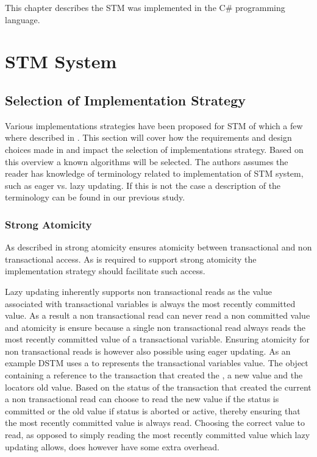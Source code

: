 \makeatletter {}\makeatother
{}
This chapter describes the \ac{STM} was implemented in the C\# programming language.
\label{chap:implementation}
\section{\acs{STM} System}
\subsection{Selection of Implementation Strategy}
Various implementations strategies have been proposed for \ac{STM} of which a few where described in . This section will cover how the requirements and design choices made in  and  impact the selection of implementations strategy. Based on this overview a known algorithms will be selected. The authors assumes the reader has knowledge of terminology related to implementation of \ac{STM} system, such as eager vs. lazy updating. If this is not the case a description of the terminology can be found in our previous study\cite[p. 53]{dpt907e14trending}.

\subsubsection{Strong Atomicity}
As described in  strong atomicity ensures atomicity between transactional and non transactional access. As \stmnamesp is required to support strong atomicity the implementation strategy should facilitate such access.

Lazy updating inherently supports non transactional reads as the value associated with transactional variables is always the most recently committed value\cite[p. 2084]{herlihy2011tm}\cite[p. 21]{harris2010transactional}. As a result a non transactional read can never read a non committed value and atomicity is ensure because a single non transactional read always reads the most recently committed value of a transactional variable. Ensuring atomicity for non transactional reads is however also possible using eager updating. As an example DSTM\cite{herlihy2003software} uses a  to represents the transactional variables value. The  object containing a reference to the transaction that created the , a new value and the locators old value.  Based on the status of the transaction that created the current  a non transactional read can choose to read the new value if the status is committed or the old value if status is aborted or active, thereby ensuring that the most recently committed value is always read. Choosing the correct value to read, as opposed to simply reading the most recently committed value which lazy updating allows, does however have some extra overhead.

